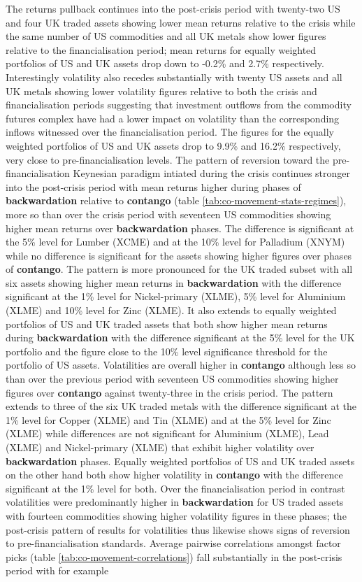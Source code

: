 \documentclass[]{elsarticle} %
\begin{document}
The returns pullback continues into the post-crisis period with twenty-two US and four UK traded assets showing lower mean returns relative to the crisis while the same number of US commodities and all UK metals show lower figures relative to the financialisation period; mean returns for equally weighted portfolios of US and UK assets drop down to -0.2\% and 2.7\% respectively. Interestingly volatility also recedes substantially with twenty US assets and all UK metals showing lower volatility figures relative to both the crisis and financialisation periods suggesting that investment outflows from the commodity futures complex have had a lower impact on volatility than the corresponding inflows witnessed over the financialisation period. The figures for the equally weighted portfolios of US and UK assets drop to 9.9\% and 16.2\% respectively, very close to pre-financialisation levels. The pattern of reversion toward the pre-financialisation Keynesian paradigm intiated during the crisis continues stronger into the post-crisis period with mean returns higher during phases of \textbf{backwardation} relative to \textbf{contango} (table \ref{tab:co-movement-stats-regimes}), more so than over the crisis period with seventeen US commodities showing higher mean returns over \textbf{backwardation} phases. The difference is significant at the 5\% level for Lumber (XCME) and at the 10\% level for Palladium (XNYM) while no difference is significant for the assets showing higher figures over phases of \textbf{contango}. The pattern is more pronounced for the UK traded subset with all six assets showing higher mean returns in \textbf{backwardation} with the difference significant at the 1\% level for Nickel-primary (XLME), 5\% level for Aluminium (XLME) and 10\% level for Zinc (XLME). It also extends to equally weighted portfolios of US and UK traded assets that both show higher mean returns during \textbf{backwardation} with the difference significant at the 5\% level for the UK portfolio and the figure close to the 10\% level significance threshold for the portfolio of US assets. Volatilities are overall higher in \textbf{contango} although less so than over the previous period with seventeen US commodities showing higher figures over \textbf{contango} against twenty-three in the crisis period. The pattern extends to three of the six UK traded metals with the difference significant at the 1\% level for Copper (XLME) and Tin (XLME) and at the 5\% level for Zinc (XLME) while differences are not significant for Aluminium (XLME), Lead (XLME) and Nickel-primary (XLME) that exhibit higher volatility over \textbf{backwardation} phases. Equally weighted portfolios of US and UK traded assets on the other hand both show higher volatility in \textbf{contango} with the difference significant at the 1\% level for both. Over the financialisation period in contrast volatilities were predominantly higher in \textbf{backwardation} for US traded assets with fourteen commodities showing higher volatility figures in these phases; the post-crisis pattern of results for volatilities thus likewise shows signs of reversion to pre-financialisation standards. Average pairwise correlations amongst factor picks (table \ref{tab:co-movement-correlations}) fall substantially in the post-crisis period with for example 
\end{document}
